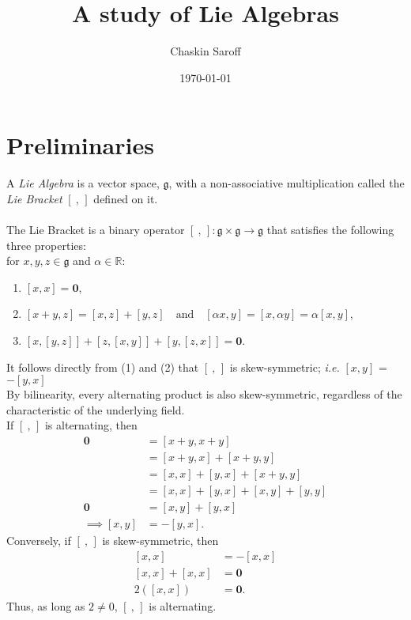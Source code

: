 \documentclass[11 pt]{article}
\title{A study of Lie Algebras}
\author{Chaskin Saroff}
\date{\today} \draft
\renewcommand{\a}{\alpha}
\newcommand{\br}[2]{\left[#1,#2\right]}
\newcommand{\bre}{\br{\ }{\,}}
\newcommand{\fg}{\mathfrak{g}}
\newcommand{\zvec}{\mathbf{0}}
\newcommand{\RR}{\mathbb{R}}
\begin{document}
\maketitle


\section{Preliminaries}

\begin{definition}

    A \emph{Lie Algebra} is a vector space, $\fg$, with a non-associative
    multiplication called the \emph{Lie Bracket} $\bre$ defined on it.
\\
\\The Lie Bracket is a binary operator $ \bre: \fg \times \fg \to \fg$
that satisfies the following three properties:
\\for $x,y,z \in \fg$ and $\a \in \RR$:
\begin{enumerate}
    \item  $\br{x}{x}=\zvec$,

    \item  $\br{x+y}{z} = \br{x}{z}+\br{y}{z}\quad
        \text{and} \quad \br{\a x}{y}=\br{x}{ \a y}=\a\br{x}{y}$,

    \item  $\br{x}{\br{y}{z}} + \br{z}{\br{x}{y}} + \br{y}{\br{z}{x}} = \zvec$.
\end{enumerate}
\end{definition}
It follows directly from (1) and (2) that $\bre$ is skew-symmetric;
\emph{i.e.} $\br{x}{y}$ = $-\br{y}{x}$
\\By bilinearity, every alternating product is also skew-symmetric, regardless
of the characteristic of the underlying field.
\\If $\bre$ is alternating, then
    \begin{align}
        \zvec &= \br{x + y}{x + y}
        \\&= \br{x + y}{x} + \br{x + y}{y}
        \\&= \br{x}{x} + \br{y}{x} + \br{x + y}{y}
        \\&= \br{x}{x} + \br{y}{x} + \br{x}{y} + \br{y}{y}
        \\\zvec&=         \br{x}{y} + \br{y}{x}
        \\\implies \br{x}{y} &= -\br{y}{x}.
    \end{align}
    Conversely, if $\bre$ is skew-symmetric, then
    \begin{align}
        \br{x}{x} &= -\br{x}{x}
        \\ \br{x}{x}+\br{x}{x}&=\zvec
        \\ 2(\br{x}{x})&=\zvec.
    \end{align}
    Thus, as long as $2 \neq 0$, $\bre$ is alternating.
\end{document}

